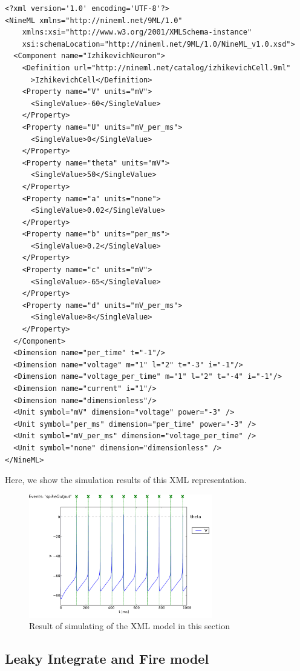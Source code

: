 \documentclass[draftspec]{ninemlspec}
\begin{document}
\begin{lstlisting}
<?xml version='1.0' encoding='UTF-8'?>
<NineML xmlns="http://nineml.net/9ML/1.0"
    xmlns:xsi="http://www.w3.org/2001/XMLSchema-instance"
    xsi:schemaLocation="http://nineml.net/9ML/1.0/NineML_v1.0.xsd">
  <Component name="IzhikevichNeuron">
    <Definition url="http://nineml.net/catalog/izhikevichCell.9ml"
      >IzhikevichCell</Definition>
    <Property name="V" units="mV">
      <SingleValue>-60</SingleValue>
    </Property>
    <Property name="U" units="mV_per_ms">
      <SingleValue>0</SingleValue>
    </Property>
    <Property name="theta" units="mV">
      <SingleValue>50</SingleValue>
    </Property>
    <Property name="a" units="none">
      <SingleValue>0.02</SingleValue>
    </Property>
    <Property name="b" units="per_ms">
      <SingleValue>0.2</SingleValue>
    </Property>
    <Property name="c" units="mV">
      <SingleValue>-65</SingleValue>
    </Property>
    <Property name="d" units="mV_per_ms">
      <SingleValue>8</SingleValue>
    </Property>
  </Component>
  <Dimension name="per_time" t="-1"/>
  <Dimension name="voltage" m="1" l="2" t="-3" i="-1"/>
  <Dimension name="voltage_per_time" m="1" l="2" t="-4" i="-1"/>
  <Dimension name="current" i="1"/>
  <Dimension name="dimensionless"/>
  <Unit symbol="mV" dimension="voltage" power="-3" />
  <Unit symbol="per_ms" dimension="per_time" power="-3" />
  <Unit symbol="mV_per_ms" dimension="voltage_per_time" />
  <Unit symbol="none" dimension="dimensionless" />
</NineML>
\end{lstlisting}

Here, we show the simulation results of this XML representation.
\begin{figure}[htb!]
\center
\includegraphics[width=8cm]{figures/example_IzVoltageWave.pdf}
\protect\caption{Result of simulating of the XML model in
this section}
\label{fig:Ex1_Output}
\end{figure}

\newpage
\subsection{Leaky Integrate and Fire model}
\end{document}
